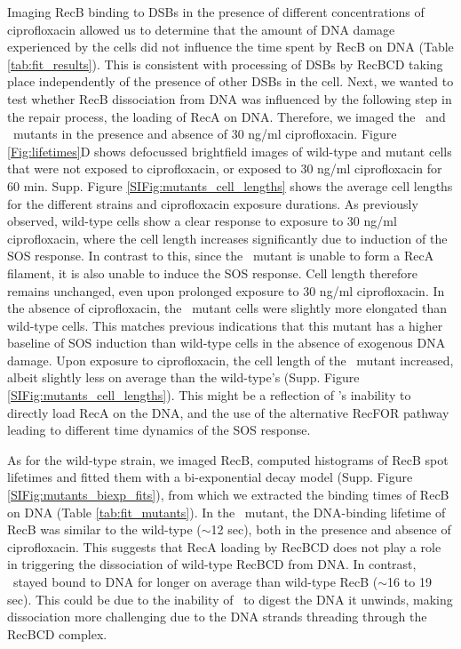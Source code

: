 Imaging RecB binding to DSBs in the presence of different concentrations of ciprofloxacin allowed us to determine that the amount of DNA damage experienced by the cells did not influence the time spent by RecB on DNA (Table \ref{tab:fit_results}). This is consistent with processing of DSBs by RecBCD taking place independently of the presence of other DSBs in the cell. Next, we wanted to test whether RecB dissociation from DNA was influenced by the following step in the repair process, the loading of RecA on DNA. Therefore, we imaged the \dreca\ and \geneteneighty\ mutants in the presence and absence of 30 ng/ml ciprofloxacin. Figure \ref{Fig:lifetimes}D shows defocussed brightfield images of wild-type and mutant cells that were not exposed to ciprofloxacin, or exposed to 30 ng/ml ciprofloxacin for 60 min. Supp. Figure \ref{SIFig:mutants_cell_lengths} shows the average cell lengths for the different strains and ciprofloxacin exposure durations. As previously observed, wild-type cells show a clear response to exposure to 30 ng/ml ciprofloxacin, where the cell length increases significantly due to induction of the SOS response. In contrast to this, since the \dreca\ mutant is unable to form a RecA filament, it is also unable to induce the SOS response. Cell length therefore remains unchanged, even upon prolonged exposure to 30 ng/ml ciprofloxacin. In the absence of ciprofloxacin, the \geneteneighty\ mutant cells were slightly more elongated than wild-type cells. This matches previous indications that this mutant has a higher baseline of SOS induction than wild-type cells in the absence of exogenous DNA damage\cite{Lepore2023}. Upon exposure to ciprofloxacin, the cell length of the \geneteneighty\ mutant increased, albeit slightly less on average than the wild-type's (Supp. Figure \ref{SIFig:mutants_cell_lengths}). This might be a reflection of \teneighty's inability to directly load RecA on the DNA, and the use of the alternative RecFOR pathway leading to different time dynamics of the SOS response\cite{Ivancic-Bace_2003,Lepore2023}.

As for the wild-type strain, we imaged RecB, computed histograms of RecB spot lifetimes and fitted them with a bi-exponential decay model (Supp. Figure \ref{SIFig:mutants_biexp_fits}), from which we extracted the binding times of RecB on DNA (Table \ref{tab:fit_mutants}). In the \dreca\ mutant, the DNA-binding lifetime of RecB was similar to the wild-type ($\sim$12 sec), both in the presence and absence of ciprofloxacin. This suggests that RecA loading by RecBCD does not play a role in triggering the dissociation of wild-type RecBCD from DNA. In contrast, \teneighty\ stayed bound to DNA for longer on average than wild-type RecB ($\sim$16 to 19 sec). This could be due to the inability of \teneighty\ to digest the DNA it unwinds, making dissociation more challenging due to the DNA strands threading through the RecBCD complex.


